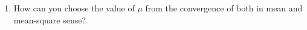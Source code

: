 \documentclass[journal,12pt,twocolumn]{IEEEtran}
\renewcommand\thesection{\arabic{section}}
\renewcommand\thesubsection{\thesection.\arabic{subsection}}
\begin{document}
\begin{enumerate}[label=\thesubsection.\arabic*
,ref=\thesubsection.\theenumi]
\item
How can you choose the value of $\mu$ from the convergence of both in mean and mean-square sense?

\end{enumerate}
\end{document}
